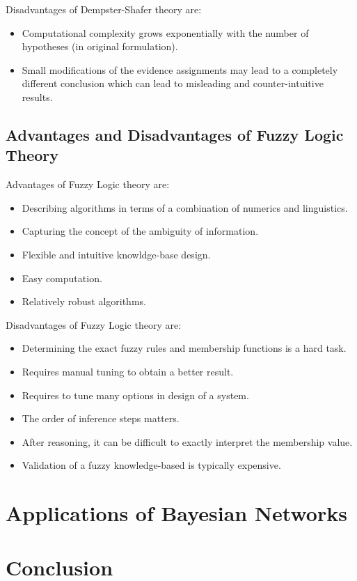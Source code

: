 \documentclass[11pt]{article}
\begin{document}
\noindent Disadvantages of Dempster-Shafer theory are:

\begin{itemize}
  \item Computational complexity grows exponentially with the number of
  hypotheses (in original formulation).
  
  \item Small modifications of the evidence assignments may lead to a
  completely different conclusion which can lead to misleading and
  counter-intuitive results.
\end{itemize}

\subsection{Advantages and Disadvantages of Fuzzy Logic Theory}

Advantages of Fuzzy Logic theory are:

\begin{itemize}
  \item Describing algorithms in terms of a combination of numerics and
  linguistics.
  \item Capturing the concept of the ambiguity of information.
  \item Flexible and intuitive knowldge-base design.
  \item Easy computation.
  \item Relatively robust algorithms.
\end{itemize}

\noindent Disadvantages of Fuzzy Logic theory are:

\begin{itemize}
  \item Determining the exact fuzzy rules and membership functions is a hard
  task.
  \item Requires manual tuning to obtain a better result.
  \item Requires to tune many options in design of a system.
  \item The order of inference steps matters.
  \item After reasoning, it can be difficult to exactly interpret the membership
  value.
  \item Validation of a fuzzy knowledge-based is typically expensive.
\end{itemize}

\section{Applications of Bayesian Networks}

\section{Conclusion}



\end{document}
